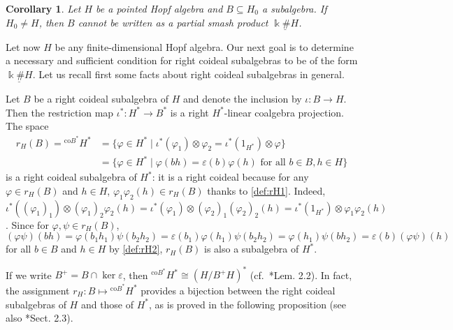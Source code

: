 \documentclass[reqno]{amsart}
\newtheorem{cor}[thm]{Corollary}
\theoremstyle{definition}
\numberwithin{equation}{section}\theoremstyle{plain}
\theoremstyle{definition}
\def \k {\Bbbk}
\begin{document}
\begin{cor}
Let $H$ be a pointed Hopf algebra and $B \subseteq H_0$ a subalgebra.
If \(H_0 \neq H\), then $B$ cannot be written as a partial smash product \(\underline{\k \# H}\).
\end{cor}

\medbreak
    
Let now \(H\) be any finite-dimensional Hopf algebra. Our next goal is to determine a necessary and sufficient condition for right coideal subalgebras to be of the form \(\underline{\k \# H}\).
    Let us recall first some facts about right coideal subalgebras in general.

    Let \(B\) be a right coideal subalgebra of \(H\) and denote the inclusion by \(\iota : B \to H\). Then the restriction map \(\iota^* : H^* \to B^*\) is a right \(H^*\)-linear coalgebra projection. The space
    \begin{align}
        r_H(B) = {^{\mathrm{co} B^*}} H^* &= \{\varphi \in H^* \mid \iota^*(\varphi_1) \otimes \varphi_2 = \iota^*(1_{H^*}) \otimes \varphi\} \label{def:rH1} \\
        &= \{\varphi \in H^* \mid \varphi(bh) = \varepsilon(b) \varphi(h) \text{ for all } b \in B, h \in H\} \label{def:rH2}
    \end{align}
    is a right coideal subalgebra of \(H^*\): it is a right coideal because for any \(\varphi \in r_H(B)\) and \(h \in H\), \(\varphi_1 \varphi_2(h) \in r_H(B)\) thanks to \eqref{def:rH1}. Indeed, \(\iota^*((\varphi_1)_1) \otimes (\varphi_1)_2 \varphi_2(h) = \iota^*(\varphi_1) \otimes (\varphi_2)_1 (\varphi_2)_2(h) = \iota^*(1_{H^*}) \otimes \varphi_1 \varphi_2(h)\). Since for \(\varphi, \psi \in r_H(B)\), 
    \[(\varphi \psi)(bh) = \varphi(b_1 h_1) \psi(b_2 h_2) = \varepsilon(b_1) \varphi(h_1) \psi(b_2 h_2) = \varphi(h_1) \psi(bh_2) = \varepsilon(b) (\varphi\psi)(h)\]
    for all \(b \in B\) and \(h \in H\) by \eqref{def:rH2}, \(r_H(B)\) is also a subalgebra of \(H^*\).
    
    If we write \(B^+ = B \cap \ker \varepsilon\), then \({^{\mathrm{co} B^*}} H^* \cong (H / B^+H)^*\) (cf.\ \cite{shimizu}*{Lem. 2.2}). In fact, the assignment \(r_H : B \mapsto {^{\mathrm{co} B^*}} H^*\) provides a bijection between the right coideal subalgebras of \(H\) and those of \(H^*\), as is proved in the following proposition (see also \cite{shimizu}*{Sect. 2.3}).
\end{document}
